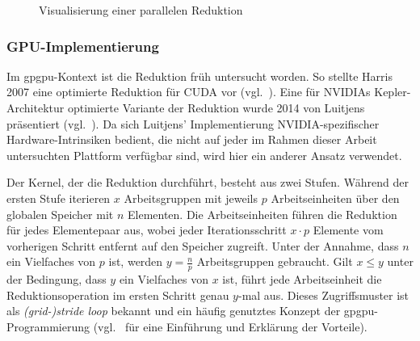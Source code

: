 \begin{figure}[htb]
    \caption{Visualisierung einer parallelen Reduktion}
    \label{methoden:reduction:viz}
\end{figure}

\subsubsection{GPU-Implementierung}

Im \gls{gpgpu}-Kontext ist die Reduktion früh untersucht worden. So stellte
Harris 2007 eine optimierte Reduktion für CUDA vor (vgl.~\cite{harris2007}). 
Eine für NVIDIAs Kepler-Architektur optimierte Variante der Reduktion wurde 2014
von Luitjens präsentiert (vgl.~\cite{luitjens2014}). Da sich Luitjens'
Implementierung NVIDIA-spezifischer Hardware-Intrinsiken bedient, die nicht auf
jeder im Rahmen dieser Arbeit untersuchten Plattform verfügbar sind, wird hier
ein anderer Ansatz verwendet.

Der Kernel, der die Reduktion durchführt, besteht aus zwei Stufen. Während der
ersten Stufe iterieren $x$ Arbeitsgruppen mit jeweils $p$ Arbeitseinheiten über
den globalen Speicher mit $n$ Elementen. Die Arbeitseinheiten führen die
Reduktion für jedes Elementepaar aus, wobei jeder Iterationsschritt $x \cdot p$
Elemente vom vorherigen Schritt entfernt auf den Speicher zugreift. Unter der
Annahme, dass $n$ ein Vielfaches von $p$ ist, werden $y = \frac{n}{p}$
Arbeitsgruppen gebraucht. Gilt $x \leq y$ unter der Bedingung, dass $y$ ein
Vielfaches von $x$ ist, führt jede Arbeitseinheit die Reduktionsoperation im
ersten Schritt genau $y$-mal aus. Dieses Zugriffsmuster ist als
\textit{(grid-)stride loop} bekannt und ein häufig genutztes Konzept der
\gls{gpgpu}-Programmierung (vgl.~\cite{harris2013} für eine Einführung und
Erklärung der Vorteile).

